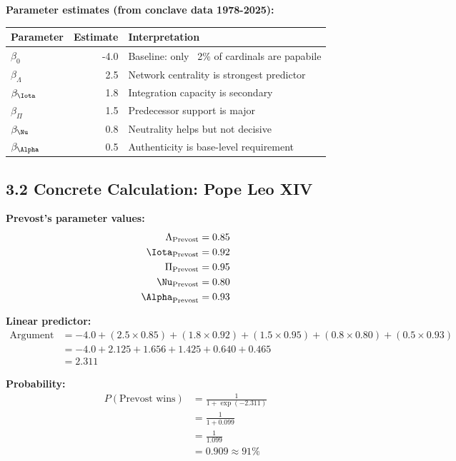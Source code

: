 \documentclass[11pt]{article}
\begin{document}
\textbf{Parameter estimates (from conclave data 1978-2025):}

\begin{table}[h]
\centering
\begin{tabular}{|l|r|l|}
\hline
\textbf{Parameter} & \textbf{Estimate} & \textbf{Interpretation} \\
\hline
$\beta_0$ & -4.0 & Baseline: only ~2\% of cardinals are papabile \\
$\beta_\Lambda$ & 2.5 & Network centrality is strongest predictor \\
$\beta_\Iota$ & 1.8 & Integration capacity is secondary \\
$\beta_\Pi$ & 1.5 & Predecessor support is major \\
$\beta_\Nu$ & 0.8 & Neutrality helps but not decisive \\
$\beta_\Alpha$ & 0.5 & Authenticity is base-level requirement \\
\hline
\end{tabular}
\end{table}

\subsection{3.2 Concrete Calculation: Pope Leo XIV}

\textbf{Prevost's parameter values:}
\begin{align*}
\Lambda_{\text{Prevost}} &= 0.85 \\
\Iota_{\text{Prevost}} &= 0.92 \\
\Pi_{\text{Prevost}} &= 0.95 \\
\Nu_{\text{Prevost}} &= 0.80 \\
\Alpha_{\text{Prevost}} &= 0.93
\end{align*}

\textbf{Linear predictor:}
\begin{align*}
\text{Argument} &= -4.0 + (2.5 \times 0.85) + (1.8 \times 0.92) + (1.5 \times 0.95) + (0.8 \times 0.80) + (0.5 \times 0.93) \\
&= -4.0 + 2.125 + 1.656 + 1.425 + 0.640 + 0.465 \\
&= 2.311
\end{align*}

\textbf{Probability:}
\begin{align*}
P(\text{Prevost wins}) &= \frac{1}{1 + \exp(-2.311)} \\
&= \frac{1}{1 + 0.099} \\
&= \frac{1}{1.099} \\
&= 0.909 \approx 91\%
\end{align*}
\end{document}
